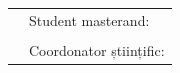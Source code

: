 \documentclass[12pt,a4paper,twoside]{report}
\begin{document}
\begin{titlepage}
\begin{flushleft}
\end{flushleft}

\vspace{3.5cm}

\begin{center}
%
\begin{tabularx}{\textwidth}{X X}  %
 & Student masterand: \dotfill \\
 & \\
 & Coordonator științific: \dotfill \\
\end{tabularx}



\end{center}

\end{titlepage}


\begin{titlepage}
\phantom{1}
\end{titlepage}
\end{document}
